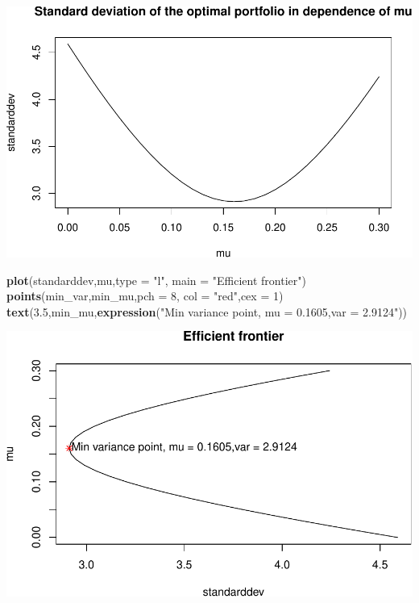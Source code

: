 \documentclass[]{article}
\newenvironment{Shaded}{\begin{snugshade}}{\end{snugshade}}
\newcommand{\KeywordTok}[1]{\textcolor[rgb]{0.13,0.29,0.53}{\textbf{#1}}}
\newcommand{\DataTypeTok}[1]{\textcolor[rgb]{0.13,0.29,0.53}{#1}}
\newcommand{\DecValTok}[1]{\textcolor[rgb]{0.00,0.00,0.81}{#1}}
\newcommand{\FloatTok}[1]{\textcolor[rgb]{0.00,0.00,0.81}{#1}}
\newcommand{\StringTok}[1]{\textcolor[rgb]{0.31,0.60,0.02}{#1}}
\newcommand{\NormalTok}[1]{#1}
\begin{document}
\includegraphics{Markowitz_Research_Me_files/figure-latex/unnamed-chunk-16-1.pdf}

\begin{Shaded}
\begin{Highlighting}[]
\KeywordTok{plot}\NormalTok{(standarddev,mu,}\DataTypeTok{type =} \StringTok{"l"}\NormalTok{, }\DataTypeTok{main =} \StringTok{"Efficient frontier"}\NormalTok{)}
\KeywordTok{points}\NormalTok{(min_var,min_mu,}\DataTypeTok{pch =} \DecValTok{8}\NormalTok{, }\DataTypeTok{col =} \StringTok{"red"}\NormalTok{,}\DataTypeTok{cex =} \DecValTok{1}\NormalTok{)}
\KeywordTok{text}\NormalTok{(}\FloatTok{3.5}\NormalTok{,min_mu,}\KeywordTok{expression}\NormalTok{(}\StringTok{"Min variance point, mu = 0.1605,var = 2.9124"}\NormalTok{))}
\end{Highlighting}
\end{Shaded}

\includegraphics{Markowitz_Research_Me_files/figure-latex/unnamed-chunk-16-2.pdf}
\end{document}
